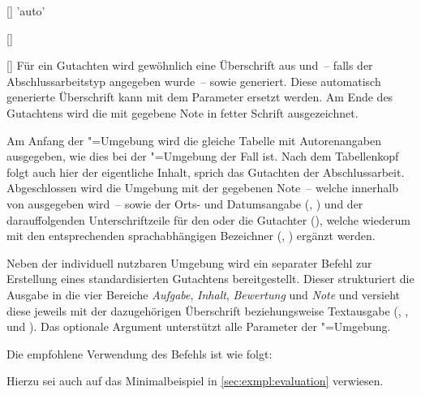 \begin{Declaration*}{}
\begin{Declaration}{[]}{%
  'auto'%
}
\begin{Declaration}{%
  []%
}
\begin{Declaration}{[]}
Für ein Gutachten wird gewöhnlich eine Überschrift aus  
und~-- falls der Abschlussarbeitstyp angegeben wurde~--  
sowie  generiert. Diese automatisch generierte Überschrift kann 
mit dem Parameter  ersetzt werden. Am 
Ende des Gutachtens wird die mit  
gegebene Note in fetter Schrift ausgezeichnet.

Am Anfang der "=Umgebung wird die gleiche Tabelle mit 
Autorenangaben ausgegeben, wie dies bei der "=Umgebung der 
Fall ist. Nach dem Tabellenkopf folgt auch hier der eigentliche Inhalt, sprich 
das Gutachten der Abschlussarbeit. Abgeschlossen wird die Umgebung mit der 
gegebenen Note~-- welche innerhalb von  ausgegeben wird~-- 
sowie der Orts- und Datumsangabe (, ) und der 
darauffolgenden Unterschriftzeile für den oder die Gutachter (), 
welche wiederum mit den entsprechenden sprachabhängigen Bezeichner 
(, ) ergänzt werden.
\end{Declaration}
\end{Declaration}
\end{Declaration}

\begin{Declaration}{\LParameter%
}
\printdeclarationlist%
%
Neben der individuell nutzbaren Umgebung  wird ein 
separater Befehl zur Erstellung eines standardisierten Gutachtens 
bereitgestellt. Dieser strukturiert die Ausgabe in die vier Bereiche 
\emph{Aufgabe}, \emph{Inhalt}, \emph{Bewertung} und \emph{Note} und versieht 
diese jeweils mit der dazugehörigen Überschrift beziehungsweise Textausgabe 
(, ,  und 
). Das optionale Argument unterstützt alle Parameter der 
"=Umgebung.
%
\end{Declaration}
%
\begin{Example}
Die empfohlene Verwendung des Befehls  ist wie folgt:
\begin{Code}[escapechar=§]
\end{Code}
Hierzu sei auch auf das Minimalbeispiel in \autoref{sec:exmpl:evaluation} 
verwiesen.
\end{Example}


\end{Declaration*}
